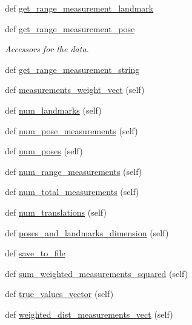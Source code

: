 \begin{DoxyCompactItemize}
def \hyperlink{classfactor__graph_1_1factor__graph_1_1FactorGraphData_ac5ea2c0ed0ce15f82416552ed4e97411}{get\+\_\+range\+\_\+measurement\+\_\+landmark}
\item
def \hyperlink{classfactor__graph_1_1factor__graph_1_1FactorGraphData_a7a62bffe4c2a942cdc8cdf6fc29e138d}{get\+\_\+range\+\_\+measurement\+\_\+pose}
\begin{DoxyCompactList}\small\item\em Accessors for the data. \end{DoxyCompactList}\item
def \hyperlink{classfactor__graph_1_1factor__graph_1_1FactorGraphData_a3af66369ec28e26cd71d59a619eee8a1}{get\+\_\+range\+\_\+measurement\+\_\+string}
\item
def \hyperlink{classfactor__graph_1_1factor__graph_1_1FactorGraphData_adf7275304d55b7cc515d051fa6a0361d}{measurements\+\_\+weight\+\_\+vect} (self)
\item
def \hyperlink{classfactor__graph_1_1factor__graph_1_1FactorGraphData_ac1119d02fbc335103af7f6c23d137924}{num\+\_\+landmarks} (self)
\item
def \hyperlink{classfactor__graph_1_1factor__graph_1_1FactorGraphData_afa632b790304a2cc8cc8f4a0c3cea69b}{num\+\_\+pose\+\_\+measurements} (self)
\item
def \hyperlink{classfactor__graph_1_1factor__graph_1_1FactorGraphData_a3c8c0cbe9342d70a859b6dfd0608b541}{num\+\_\+poses} (self)
\item
def \hyperlink{classfactor__graph_1_1factor__graph_1_1FactorGraphData_a6272b1be4eebcb3bc6adee6b15b25370}{num\+\_\+range\+\_\+measurements} (self)
\item
def \hyperlink{classfactor__graph_1_1factor__graph_1_1FactorGraphData_ad484c89da082e3257e1f2841bcb7c582}{num\+\_\+total\+\_\+measurements} (self)
\item
def \hyperlink{classfactor__graph_1_1factor__graph_1_1FactorGraphData_ad6543e9b005e555432fc4278c991591f}{num\+\_\+translations} (self)
\item
def \hyperlink{classfactor__graph_1_1factor__graph_1_1FactorGraphData_a39437312e85d5d77089abb35308f37e7}{poses\+\_\+and\+\_\+landmarks\+\_\+dimension} (self)
\item
def \hyperlink{classfactor__graph_1_1factor__graph_1_1FactorGraphData_a146c15b87bac524ac2065baade1f13f6}{save\+\_\+to\+\_\+file}
\item
def \hyperlink{classfactor__graph_1_1factor__graph_1_1FactorGraphData_ae93a95488839922042c1a1d1cc4c7d01}{sum\+\_\+weighted\+\_\+measurements\+\_\+squared} (self)
\item
def \hyperlink{classfactor__graph_1_1factor__graph_1_1FactorGraphData_aba8ce3c245aedcc25b47176a7c09bf06}{true\+\_\+values\+\_\+vector} (self)
\item
def \hyperlink{classfactor__graph_1_1factor__graph_1_1FactorGraphData_ac16b73f60aed4ed84e39019b30052435}{weighted\+\_\+dist\+\_\+measurements\+\_\+vect} (self)
\end{DoxyCompactItemize}
